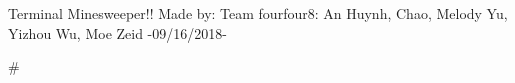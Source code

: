 Terminal Minesweeper!! Made by\+: Team fourfour8\+: An Huynh, Chao, Melody Yu, Yizhou Wu, Moe Zeid -\/09/16/2018-\/

\# 
